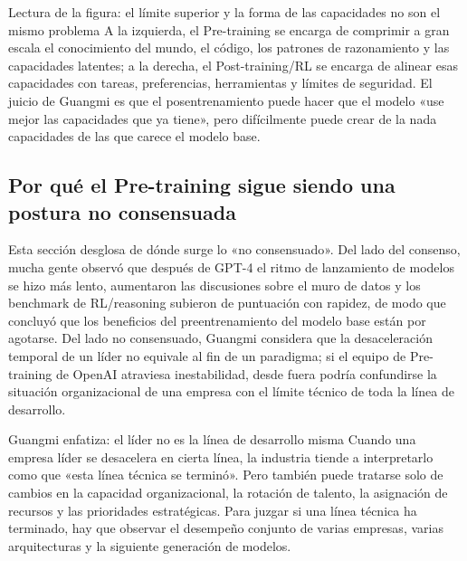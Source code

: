 \documentclass[a4paper]{article}
\begin{document}
\begin{knowledgebox}{Lectura de la figura: el límite superior y la forma de las capacidades no son el mismo problema}
A la izquierda, el Pre-training se encarga de comprimir a gran escala el conocimiento del mundo, el código, los patrones de razonamiento y las capacidades latentes; a la derecha, el Post-training/RL se encarga de alinear esas capacidades con tareas, preferencias, herramientas y límites de seguridad. El juicio de Guangmi es que el posentrenamiento puede hacer que el modelo «use mejor las capacidades que ya tiene», pero difícilmente puede crear de la nada capacidades de las que carece el modelo base.
\end{knowledgebox}

\subsection{Por qué el Pre-training sigue siendo una postura no consensuada}

Esta sección desglosa de dónde surge lo «no consensuado». Del lado del consenso, mucha gente observó que después de GPT-4 el ritmo de lanzamiento de modelos se hizo más lento, aumentaron las discusiones sobre el muro de datos y los benchmark de RL/reasoning subieron de puntuación con rapidez, de modo que concluyó que los beneficios del preentrenamiento del modelo base están por agotarse. Del lado no consensuado, Guangmi considera que la desaceleración temporal de un líder no equivale al fin de un paradigma; si el equipo de Pre-training de OpenAI atraviesa inestabilidad, desde fuera podría confundirse la situación organizacional de una empresa con el límite técnico de toda la línea de desarrollo.

\begin{importantbox}{Guangmi enfatiza: el líder no es la línea de desarrollo misma}
Cuando una empresa líder se desacelera en cierta línea, la industria tiende a interpretarlo como que «esta línea técnica se terminó». Pero también puede tratarse solo de cambios en la capacidad organizacional, la rotación de talento, la asignación de recursos y las prioridades estratégicas. Para juzgar si una línea técnica ha terminado, hay que observar el desempeño conjunto de varias empresas, varias arquitecturas y la siguiente generación de modelos.
\end{importantbox}
\end{document}
